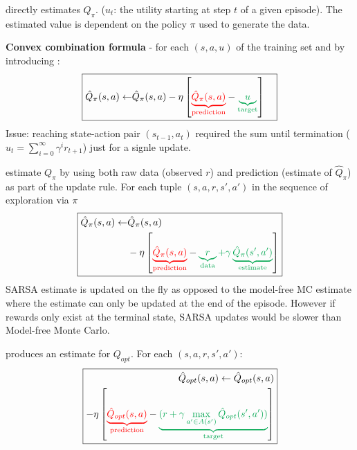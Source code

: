  directly estimates $Q_\pi$.
($u_t$: the utility starting at step $t$ of a given episode).  The estimated
value is dependent on the policy $\pi$ used to generate the data.

\textbf{Convex combination formula} - for each $(s,a,u)$ of the training set and by
introducing :
\begin{displaymath}
\boxed{
\begin{aligned}
    \hat{Q}_\pi(s,a) \leftarrow & \hat{Q}_\pi(s,a) - \eta \left[
        \textcolor{red}{\underbrace{\hat{Q}_\pi(s,a)}_{\text{prediction}}}
        - \textcolor{Green}{\underbrace{u}_{\text{target}}}
    \right]
\end{aligned}
}
\end{displaymath}
Issue: reaching state-action pair $(s_{t-1}, a_t)$ required the sum until
termination ($u_t = \sum_{i=0}^{\infty}\gamma^i r_{t+1}$) just for a signle
update.

 estimate $Q_\pi$ by using both raw data (observed $r$) and
prediction (estimate of $\hat{Q}_\pi$) as part of the update rule. For each
tuple $(s,a,r,s',a')$ in the sequence of exploration via $\pi$
\begin{displaymath}
\boxed{
\begin{aligned}
    \hat{Q}_\pi(s,a) \leftarrow & \hat{Q}_\pi(s,a) \\
    &- \eta \left[
        \textcolor{red}{\underbrace{\hat{Q}_\pi(s,a)}_{\text{prediction}}}
        - \textcolor{Green}{\underbrace{r}_{\text{data}} + \gamma \underbrace{\hat{Q}_\pi(s',a')}_{\text{estimate}}}
    \right]
\end{aligned}
}
\end{displaymath}
SARSA estimate is updated on the fly as opposed to the model-free MC estimate
where the estimate can only be updated at the end of the episode. However if
rewards only exist at the terminal state, SARSA updates would be slower than
Model-free Monte Carlo.

 produces an estimate for $Q_{opt}$. For each
$(s,a,r,s',a')$:
\begin{displaymath}
\boxed{
\begin{aligned}
    \hat{Q}_{opt}(s,a) \leftarrow \hat{Q}_{opt}(s,a) \\
    - \eta \left[
        \textcolor{red}{\underbrace{\hat{Q}_{opt}(s,a)}_{\text{prediction}}}
        - \textcolor{Green}{\underbrace{(r + \gamma \max_{a' \in A(s')}\hat{Q}_{opt}(s',a'))}_{\text{target}}}
    \right]
\end{aligned}
}
\end{displaymath}

